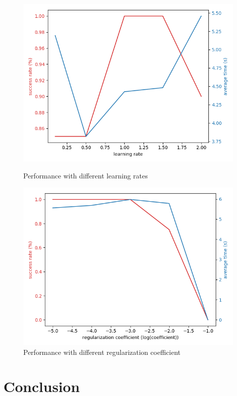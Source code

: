 \documentclass{article}
\begin{document}
\begin{figure}[t]
    \centering
    \begin{minipage}{.5\textwidth}
        \centering
        \includegraphics[width=\textwidth]{learning_rate}
        \caption{Performance with different learning rates} 
        \label{fig:lrate}    
    \end{minipage}%
    \begin{minipage}{.5\textwidth}
        \centering
        \includegraphics[width=\textwidth]{reg_coeff}
        \caption{Performance with different regularization coefficient}
        \label{fig:regcoeff}
    \end{minipage}
\end{figure}


\section{Conclusion}


 
\end{document}
